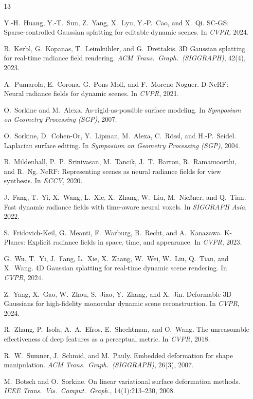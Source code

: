 \documentclass[10pt,twocolumn]{article}
\begin{document}
\begin{thebibliography}{13}\footnotesize\setlength{\itemsep}{1pt}

Y.-H.~Huang, Y.-T.~Sun, Z.~Yang, X.~Lyu, Y.-P.~Cao, and X.~Qi.
\newblock SC-GS: Sparse-controlled Gaussian splatting for editable dynamic scenes.
\newblock In \emph{CVPR}, 2024.

B.~Kerbl, G.~Kopanas, T.~Leimk{\"u}hler, and G.~Drettakis.
\newblock 3D Gaussian splatting for real-time radiance field rendering.
\newblock \emph{ACM Trans.\ Graph.\ (SIGGRAPH)}, 42(4), 2023.

A.~Pumarola, E.~Corona, G.~Pons-Moll, and F.~Moreno-Noguer.
\newblock D-NeRF: Neural radiance fields for dynamic scenes.
\newblock In \emph{CVPR}, 2021.

O.~Sorkine and M.~Alexa.
\newblock As-rigid-as-possible surface modeling.
\newblock In \emph{Symposium on Geometry Processing (SGP)}, 2007.

O.~Sorkine, D.~Cohen-Or, Y.~Lipman, M.~Alexa, C.~R{\"o}ssl, and H.-P.~Seidel.
\newblock Laplacian surface editing.
\newblock In \emph{Symposium on Geometry Processing (SGP)}, 2004.

B.~Mildenhall, P.~P.~Srinivasan, M.~Tancik, J.~T.~Barron, R.~Ramamoorthi, and R.~Ng.
\newblock NeRF: Representing scenes as neural radiance fields for view synthesis.
\newblock In \emph{ECCV}, 2020.

J.~Fang, T.~Yi, X.~Wang, L.~Xie, X.~Zhang, W.~Liu, M.~Nie{\ss}ner, and Q.~Tian.
\newblock Fast dynamic radiance fields with time-aware neural voxels.
\newblock In \emph{SIGGRAPH Asia}, 2022.

S.~Fridovich-Keil, G.~Meanti, F.~Warburg, B.~Recht, and A.~Kanazawa.
\newblock K-Planes: Explicit radiance fields in space, time, and appearance.
\newblock In \emph{CVPR}, 2023.

G.~Wu, T.~Yi, J.~Fang, L.~Xie, X.~Zhang, W.~Wei, W.~Liu, Q.~Tian, and X.~Wang.
\newblock 4D Gaussian splatting for real-time dynamic scene rendering.
\newblock In \emph{CVPR}, 2024.

Z.~Yang, X.~Gao, W.~Zhou, S.~Jiao, Y.~Zhang, and X.~Jin.
\newblock Deformable 3D Gaussians for high-fidelity monocular dynamic scene reconstruction.
\newblock In \emph{CVPR}, 2024.

R.~Zhang, P.~Isola, A.~A.~Efros, E.~Shechtman, and O.~Wang.
\newblock The unreasonable effectiveness of deep features as a perceptual metric.
\newblock In \emph{CVPR}, 2018.

R.~W.~Sumner, J.~Schmid, and M.~Pauly.
\newblock Embedded deformation for shape manipulation.
\newblock \emph{ACM Trans.\ Graph.\ (SIGGRAPH)}, 26(3), 2007.

M.~Botsch and O.~Sorkine.
\newblock On linear variational surface deformation methods.
\newblock \emph{IEEE Trans.\ Vis.\ Comput.\ Graph.}, 14(1):213--230, 2008.

\end{thebibliography}
\end{document}
